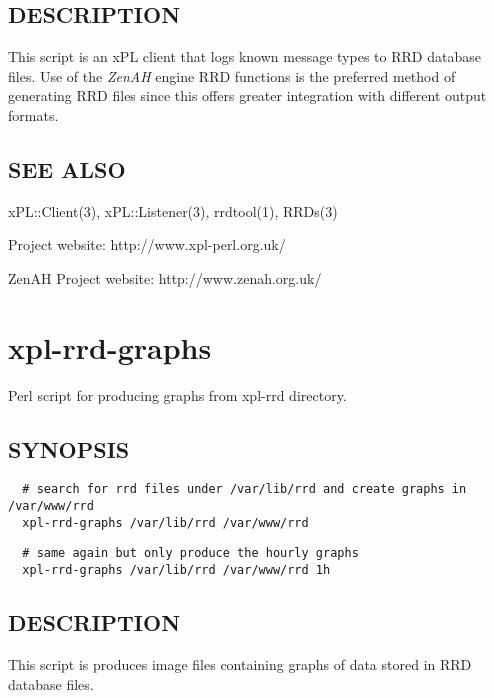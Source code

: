 \subsection*{DESCRIPTION\label{xpl-rrd_DESCRIPTION}}


This script is an xPL client that logs known message types to RRD
database files.  Use of the \emph{ZenAH} engine RRD functions is the
preferred method of generating RRD files since this offers greater
integration with different output formats.

\subsection*{SEE ALSO\label{xpl-rrd_SEE_ALSO}}


xPL::Client(3), xPL::Listener(3), rrdtool(1), RRDs(3)



Project website: http://www.xpl-perl.org.uk/



ZenAH Project website: http://www.zenah.org.uk/

\section{xpl-rrd-graphs\label{xpl-rrd-graphs}}


Perl script for producing graphs from xpl-rrd directory.

\subsection*{SYNOPSIS\label{xpl-rrd-graphs_SYNOPSIS}}
\begin{verbatim}
  # search for rrd files under /var/lib/rrd and create graphs in /var/www/rrd
  xpl-rrd-graphs /var/lib/rrd /var/www/rrd
\end{verbatim}
\begin{verbatim}
  # same again but only produce the hourly graphs
  xpl-rrd-graphs /var/lib/rrd /var/www/rrd 1h
\end{verbatim}
\subsection*{DESCRIPTION\label{xpl-rrd-graphs_DESCRIPTION}}


This script is produces image files containing graphs of data stored
in RRD database files.

